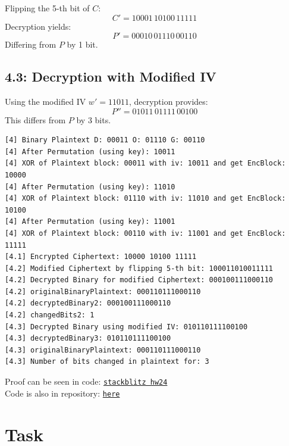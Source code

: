 \documentclass{article}
\begin{document}
Flipping the 5-th bit of \( C \):
\[
  C' = 10001\,10100\,11111
\]
Decryption yields:
\[
  P' = 00010\,01110\,00110
\]
Differing from \( P \) by 1 bit.

\subsection*{4.3: Decryption with Modified IV}

Using the modified IV \( w' = 11011 \), decryption provides:
\[
  P'' = 01011\,01111\,00100
\]
This differs from \( P \) by 3 bits.\\

\begin{verbatim}
[4] Binary Plaintext D: 00011 O: 01110 G: 00110
[4] After Permutation (using key): 10011
[4] XOR of Plaintext block: 00011 with iv: 10011 and get EncBlock: 10000
[4] After Permutation (using key): 11010
[4] XOR of Plaintext block: 01110 with iv: 11010 and get EncBlock: 10100
[4] After Permutation (using key): 11001
[4] XOR of Plaintext block: 00110 with iv: 11001 and get EncBlock: 11111
[4.1] Encrypted Ciphertext: 10000 10100 11111
[4.2] Modified Ciphertext by flipping 5-th bit: 100011010011111
[4.2] Decrypted Binary for modified Ciphertext: 000100111000110
[4.2] originalBinaryPlaintext: 000110111000110
[4.2] decryptedBinary2: 000100111000110
[4.2] changedBits2: 1
[4.3] Decrypted Binary using modified IV: 010110111100100
[4.3] decryptedBinary3: 010110111100100
[4.3] originalBinaryPlaintext: 000110111000110
[4.3] Number of bits changed in plaintext for: 3
\end{verbatim}

Proof can be seen in code: \href{https://stackblitz.com/edit/js-ekqepc?devtoolsheight=80&file=hw2_4.js&hideDevTools=false}{\texttt{stackblitz hw24}}\\
Code is also in repository: \href{https://github.com/Nurech/js-ekqepc}{\texttt{here}}

\section{Task}%


\end{document}
